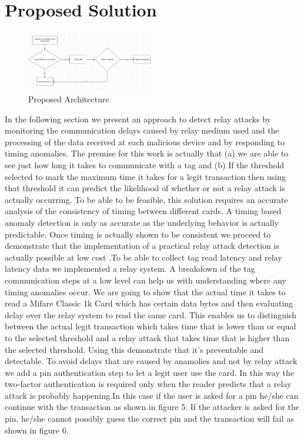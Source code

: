 \documentclass[conference]{IEEEtran}
\begin{document}
\section{Proposed Solution}
\begin{figure}[h]
\includegraphics[width=0.5\textwidth,height=0.3\textheight]{Flow}
\caption{Proposed Architecture}
\end{figure}
In the following section we present an approach to detect relay attacks by monitoring the communication delays caused by relay medium used and the processing of the data received at each malicious device and by responding to timing anomalies. The premise for this
work is actually that (a) we are able to see just how long it takes to communicate with a tag and
(b) If the threshold selected to mark the maximum time it takes for a legit transaction then using that threshold it can predict the likelihood of whether or not a relay attack is actually occurring. To be able to be feasible, this solution requires an accurate analysis
of the consistency of timing between different cards. A timing based anomaly detection is only
as accurate as the underlying behavior is actually predictable. Once timing is actually shown to be
consistent we proceed to demonstrate that the implementation of a practical relay attack detection is actually possible at low cost .To be able to collect tag read latency and relay latency data we implemented a relay system. A breakdown of the tag communication steps at a low level can help us with understanding where any timing anomalies occur. We are going to show that the actual time it takes to read a Mifare Classic 1k Card which has certain data bytes and then evaluating delay over the relay system to read the same card. This enables us to distinguish between the actual legit transaction which takes time that is lower than or equal to the selected threshold and a relay attack that takes time that is higher than the selected threshold. Using this  demonstrate that it's preventable and detectable. To avoid delays that are caused by anamolies and not by relay attack we add a pin authentication step to let a legit user use the card. In this way the two-factor authentication is required only when the reader predicts that a relay attack is probably happening.In this case if the user is asked for a pin he/she can continue with the transaction as shown in figure 5. If the attacker is asked for the pin, he/she cannot possibly guess the correct pin and the transaction will fail as shown in figure 6.
\end{document}
